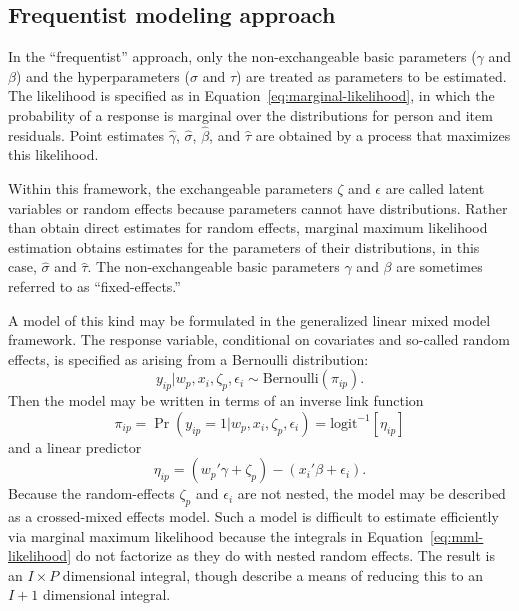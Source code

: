 \documentclass[12pt, letterpaper]{article}
\begin{document}
\subsection{Frequentist modeling approach}

In the ``frequentist'' approach, only the non-exchangeable basic parameters ($\gamma$ and  $\beta$) and the hyperparameters ($\sigma$ and $\tau$) are treated as parameters to be estimated. The likelihood is specified as in Equation~\ref{eq:marginal-likelihood}, in which the probability of a response is marginal over the distributions for person and item residuals. Point estimates $\hat\gamma$, $\hat\sigma$, $\hat\beta$, and $\hat\tau$ are obtained by a process that maximizes this likelihood.

Within this framework, the exchangeable parameters $\zeta$ and $\epsilon$ are called latent variables or random effects because parameters cannot have distributions. Rather than obtain direct estimates for random effects, marginal maximum likelihood estimation obtains estimates for the parameters of their distributions, in this case, $\hat \sigma$ and $\hat\tau$. The non-exchangeable basic parameters $\gamma$ and $\beta$ are sometimes referred to as ``fixed-effects.''

A model of this kind may be formulated in the generalized linear mixed model framework. The response variable, conditional on covariates and so-called random effects, is specified as arising from a Bernoulli distribution: 
\begin{equation}
	y_{ip} | w_p, x_i, \zeta_p, \epsilon_i \sim \mathrm{Bernoulli}(\pi_{ip})
.\end{equation}
Then the model may be written in terms of an inverse link function
\begin{equation}
	\pi_{ip} = 
	\Pr(y_{ip} = 1 | w_p, x_i, \zeta_p, \epsilon_i) =
	\mathrm{logit}^{-1}[\eta_{ip}]
\end{equation}
and a linear predictor
\begin{equation}
	\eta_{ip} =
	(w_p'\gamma + \zeta_p) -
	(x_i'\beta + \epsilon_i)
.\end{equation}
Because the random-effects $\zeta_p$ and $\epsilon_i$ are not nested, the model may be described as a crossed-mixed effects model. Such a model is difficult to estimate efficiently via marginal maximum likelihood because the integrals in Equation~\ref{eq:mml-likelihood} do not factorize as they do with nested random effects. The result is an $I \times P$ dimensional integral, though \textcite{rasbash1994efficient} describe a means of reducing this to an $I + 1$ dimensional integral.
\end{document}
